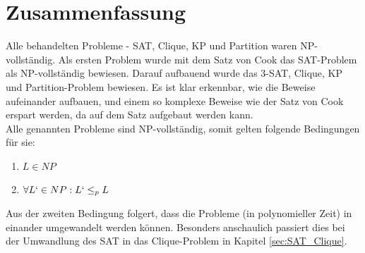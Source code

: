 \documentclass[ngerman]{article}
\begin{document}
\section{Zusammenfassung}
Alle behandelten Probleme - SAT, Clique, KP und Partition waren NP-vollständig.
Als ersten Problem wurde mit dem Satz von Cook das SAT-Problem als NP-vollständig bewiesen.
Darauf aufbauend wurde das 3-SAT, Clique, KP und Partition-Problem bewiesen.
Es ist klar erkennbar, wie die Beweise aufeinander aufbauen, und einem so komplexe Beweise wie der Satz von Cook erspart werden, da auf dem Satz aufgebaut werden kann.\\
Alle genannten Probleme sind NP-vollständig, somit gelten folgende Bedingungen für sie:
\begin{enumerate}
\item $L \in NP$
\item $\forall L` \in NP: L` \leq_p L$
\end{enumerate}
Aus der zweiten Bedingung folgert, dass die Probleme (in polynomieller Zeit) in einander umgewandelt werden können.
Besonders anschaulich passiert dies bei der Umwandlung des SAT in das Clique-Problem in Kapitel \vref{sec:SAT_Clique}.

\newpage
\def\refname{Literaturverzeichnis}
\printbibliography
\end{document}
